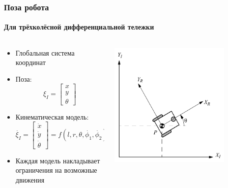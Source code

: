 \documentclass{../../slides-style}
\begin{document}
    \begin{frame}
        \frametitle{Поза робота}
        \framesubtitle{Для трёхколёсной дифференциальной тележки}
        \begin{columns}
            \begin{column}{0.6\textwidth}
                \begin{itemize}
                    \item Глобальная система координат
                    \item Поза:
                        $$\xi_I = \begin{bmatrix} x \\ y \\ \theta \end{bmatrix}$$
                    \item Кинематическая модель:
                        $$\dot{\xi_I} = \begin{bmatrix} \dot{x} \\ \dot{y} \\ \dot{\theta} \end{bmatrix} = f(l, r, \theta, \dot{\phi_1}, \dot{\phi_2})$$
                    \item Каждая модель накладывает ограничения на возможные движения
                \end{itemize}
            \end{column}
            \begin{column}{0.4\textwidth}
                \begin{center}
                    \includegraphics[width=0.8\textwidth]{pose.png}
                \end{center}
            \end{column}
        \end{columns}
    \end{frame}
\end{document}
